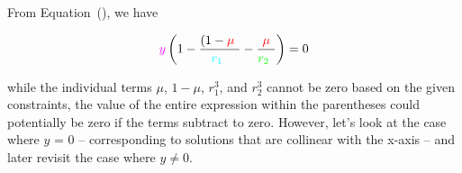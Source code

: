 From Equation~(), we have

\begin{equation}
    \textcolor{magenta}{y} \left( 1 - \ddfrac{\left(1-\cred\mu\cw\right)}{\cc r_1 \cw ^3} - \ddfrac{\cred\mu\cw}{\cg r_2 \cw ^3} \right) = 0
    \label{eq:rootsY}
\end{equation}

while the individual terms $\mu$, $1-\mu$, $r_1^3$, and $r_2^3$ cannot be zero based on the given constraints, the value of the entire expression within the parentheses could potentially be zero if the terms subtract to zero. However, let's look at the case where $y$ = 0 -- corresponding to solutions that are collinear with the x-axis -- and later revisit the case where $y \neq 0$.

\pagebreak